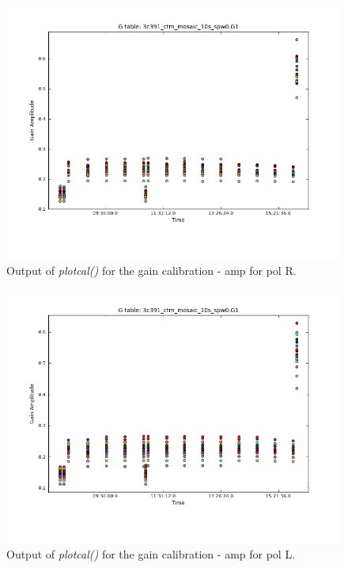 \documentclass[12pt, a4paper]{article}
\begin{document}
\newpage
\begin{figure}[h!]
    \centering
    \includegraphics[scale=0.5]{../Imaging/plots/part4-subF-question4_amp_pol-R.png}

    \caption{Output of \emph{plotcal()} for the gain calibration - amp for pol R. \label{fig:part4subF-amp-R}}
\end{figure}
\begin{figure}[h!]
    \centering
    \includegraphics[scale=0.5]{../Imaging/plots/part4-subF-question4_amp_pol-L.png}
    \caption{Output of \emph{plotcal()} for the gain calibration - amp for pol L. \label{fig:part4subF-amp-L}}
\end{figure}
\end{document}
